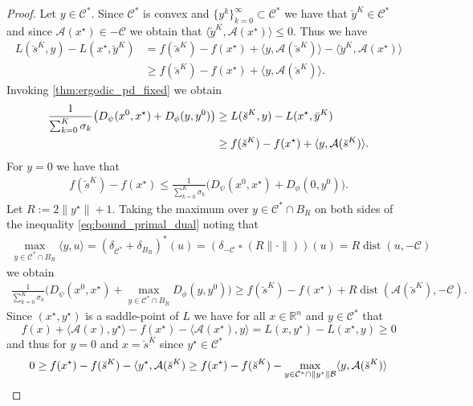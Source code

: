 \documentclass[11pt,onecolumn]{article}
\DeclareMathOperator{\infconv}{\mathbin{\square}}
\DeclareMathOperator{\dist}{dist}
\newcommand{\bR}{\mathbb{R}}
\newcommand{\cC}{\mathcal{C}}
\newcommand{\cB}{\mathcal{B}}
\theoremstyle{remark}
\begin{document}
\begin{proof}
Let $y \in \cC^*$. Since $\cC^*$ is convex and $\{y^{k}\}_{k=0}^\infty \subset \cC^*$ we have that $\breve y^{K} \in \cC^*$ and since $\mathcal{A}(x^\star) \in -\cC$ we obtain that $\langle \breve y^{K}, \mathcal{A}(x^\star) \rangle \leq 0$. Thus we have
\begin{align*}
L(\breve s^K, y) - L(x^\star, \breve y^K) &= f(\breve s^K) - f(x^\star) + \langle y, \mathcal{A}(\breve s^K)\rangle - \langle \breve y^{K}, \mathcal{A}(x^\star) \rangle \\
&\geq f(\breve s^K) - f(x^\star) + \langle y, \mathcal{A}(\breve s^K)\rangle.
\end{align*}
Invoking \cref{thm:ergodic_pd_fixed} we obtain
\begin{align}
\frac{1}{\sum_{k=0}^{K} \sigma_k} \big(D_\psi(x^0,x^\star) + D_\phi(y, y^0)\big) &\geq L(\breve s^K, y) - L(x^\star, \breve y^K) \notag \\
&\geq f(\breve s^K) - f(x^\star) + \langle y, \mathcal{A}(\breve s^K)\rangle\label{eq:bound_primal_dual}.
\end{align}
For $y =0$ we have that
\begin{align} \label{eq:ergodic_simple}
    f(\breve s^K) - f(x^\star) \leq \frac{1}{\sum_{k=0}^{K} \sigma_k} \big(D_\psi(x^0,x^\star) + D_\phi(0, y^0)\big).
\end{align}
Let $R:= 2\|y^\star\| + 1$.
Taking the maximum over $y \in \cC^* \cap B_R$ on both sides of the inequality \cref{eq:bound_primal_dual} noting that
\begin{align*}
\max_{y \in \cC^* \cap B_R} \langle y, u\rangle = (\delta_{\cC^*} + \delta_{B_R})^*(u)  =(\delta_{-\cC} \infconv (R\|\cdot\|))(u) =R \dist(u,-\cC)
\end{align*}
we obtain
\begin{align}
    \frac{1}{\sum_{k=0}^{K} \sigma_k} \big(D_\psi(x^0,x^\star) + \max_{y \in \cC^* \cap B_R} D_\phi(y, y^0)\big) \geq f(\breve s^K) - f(x^\star) + R \dist(\mathcal{A}(\breve s^K), -\cC).\label{eq:ergodic_1}
\end{align}
Since $(x^\star,y^\star)$ is a saddle-point of $L$ we have for all $x \in \bR^n$ and $y \in \cC^*$ that
$$
f(x) + \langle \mathcal{A}(x), y^\star \rangle-f(x^\star) - \langle \mathcal{A}(x^\star), y\rangle= L(x, y^\star) - L(x^\star, y) \geq 0
$$
and thus for $y=0$ and $x=\breve s^K$ since $y^\star \in \cC^*$
\begin{align} 
0 &\geq f(x^\star)-f(\breve s^K) -\langle y^\star, \mathcal{A}(\breve s^K) \geq f(x^\star)-f(\breve s^K) - \max_{y \in \cC^*\cap \|y^\star\|\cB} \langle y, \mathcal{A}(\breve s^K)\rangle \notag \\

\end{align}
\end{proof}
\end{document}
